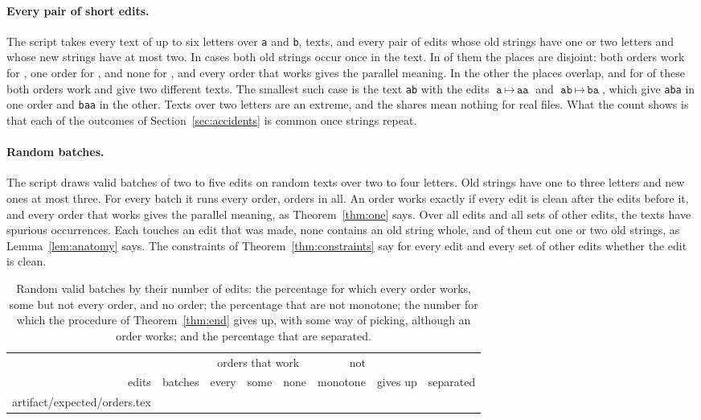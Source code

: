 \documentclass[acmsmall,nonacm,screen]{acmart}
\makeatletter
\newcommand{\edit}[2]{\texttt{#1}\,{\mapsto}\,\texttt{#2}}
\newcommand{\str}[1]{\texttt{#1}}
\newcommand{\claim}[2]{#2}
\newcommand{\rows}[1]{\@@input artifact/expected/#1.tex }
\makeatother
\begin{document}
\paragraph{Every pair of short edits.} The script takes every text of up to six letters over
\str{a} and \str{b}, \exPairTexts{} texts, and every pair of edits whose old strings have one
or two letters and whose new strings have at most two. \claim{pairs}{In \exPairs{} cases both
old strings occur once in the text. In \exPairValid{} of them the places are disjoint: both
orders work for \exPairBoth{}, one order for \exPairOne{}, and none for \exPairNeither{}, and
every order that works gives the parallel meaning. In the other \exPairOverlap{} the places
overlap, and for \exPairDiffer{} of these both orders work and give two different texts.} The
smallest such case is the text \str{ab} with the edits $\edit{a}{aa}$ and $\edit{ab}{ba}$,
which give \str{aba} in one order and \str{baa} in the other. Texts over two letters are an
extreme, and the shares mean nothing for real files. What the count shows is that each of the
outcomes of Section~\ref{sec:accidents} is common once strings repeat.

\paragraph{Random batches.} The script draws \exBatches{} valid batches of two to five edits
on random texts over two to four letters. Old strings have one to three letters and new ones
at most three. For every batch it runs every order, \exOrders{} orders in all.
\claim{one-meaning}{An order works exactly if every edit is clean after the edits before it,
and every order that works gives the parallel meaning, as Theorem~\ref{thm:one} says. Over
all edits and all sets of other edits, the texts have \exWindows{} spurious occurrences. Each
touches an edit that was made, none contains an old string whole, and \exCutting{} of them cut one or two old strings, as
Lemma~\ref{lem:anatomy} says. The constraints of Theorem~\ref{thm:constraints} say for every
edit and every set of other edits whether the edit is clean.}

\begin{table}
\caption{Random valid batches by their number of edits: the percentage for which every
order works, some but not every order, and no order; the percentage that are not monotone;
the number for which the procedure of Theorem~\ref{thm:end} gives up, with some way of
picking, although an order works; and the percentage that are separated.}\label{tab:orders}
\begin{tabular}{rr@{\qquad}rrr@{\qquad}rr@{\qquad}r}
\toprule
 & & \multicolumn{3}{c}{orders that work} & not & & \\
edits & batches & every & some & none & monotone & gives up & separated \\
\midrule
\rows{orders}
\bottomrule
\end{tabular}
\end{table}
\end{document}

